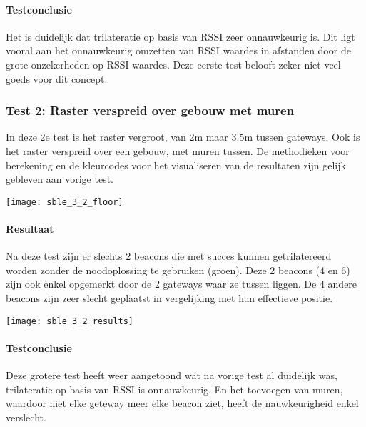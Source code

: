 \paragraph{Testconclusie}
Het is duidelijk dat trilateratie op basis van RSSI zeer onnauwkeurig is. Dit ligt vooral aan het onnauwkeurig omzetten van RSSI waardes in afstanden door de grote onzekerheden op RSSI waardes. Deze eerste test belooft zeker niet veel goeds voor dit concept.

\subsubsection{Test 2: Raster verspreid over gebouw met muren}
\begin{minipage}{0.55\textwidth}
In deze 2e test is het raster vergroot, van 2m maar 3.5m tussen gateways. Ook is het raster verspreid over een gebouw, met muren tussen.
De methodieken voor berekening en de kleurcodes voor het visualiseren van de resultaten zijn gelijk gebleven aan vorige test.
\end{minipage}
\hfill
\begin{minipage}{0.42\textwidth}
	\texttt{[image: sble\_3\_2\_floor]}
	\label{fig:ond-ble-static-3-2-ops}
\end{minipage}

\paragraph{Resultaat}
\begin{minipage}{0.55\textwidth}
Na deze test zijn er slechts 2 beacons die met succes kunnen getrilatereerd worden zonder de noodoplossing te gebruiken (groen). Deze 2 beacons (4 en 6) zijn ook enkel opgemerkt door de 2 gateways waar ze tussen liggen. De 4 andere beacons zijn zeer slecht geplaatst in vergelijking met hun effectieve positie.
\end{minipage}
\hfill
\begin{minipage}{0.42\textwidth}
	\texttt{[image: sble\_3\_2\_results]}
	\label{fig:ond-ble-static-3-2-res}
\end{minipage}

\paragraph{Testconclusie}
Deze grotere test heeft weer aangetoond wat na vorige test al duidelijk was, trilateratie op basis van RSSI is onnauwkeurig. En het toevoegen van muren, waardoor niet elke geteway meer elke beacon ziet, heeft de nauwkeurigheid enkel verslecht.

